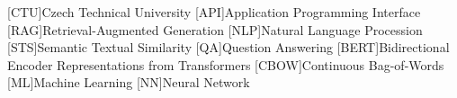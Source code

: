 
\begin{acronym}
  [CTU]{Czech Technical University}
  [API]{Application Programming Interface}
  [RAG]{Retrieval-Augmented Generation}
  [NLP]{Natural Language Procession}
  [STS]{Semantic Textual Similarity}
  [QA]{Question Answering}
  [BERT]{Bidirectional Encoder Representations from Transformers}
  [CBOW]{Continuous Bag-of-Words}
  [ML]{Machine Learning}
  [NN]{Neural Network}
\end{acronym}
